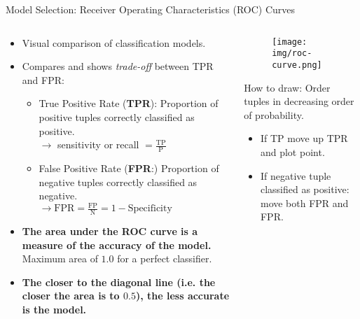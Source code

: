 \begin{frame}{Model Selection: Receiver Operating Characteristics (ROC) Curves}
	\vspace*{-1.5em}
	\begin{columns}
		\begin{column}{0.6\textwidth}
			\begin{itemize}
				\item Visual comparison of classification models.
				\item Compares and shows \textit{trade-off} between TPR and FPR:
				      \begin{itemize}
					      \item True Positive Rate (\textbf{TPR}): Proportion of positive tuples correctly classified as positive.\\
					            $\rightarrow$ sensitivity or recall $= \frac{\text{TP}}{\text{P}}$
					      \item False Positive Rate (\textbf{FPR}:) Proportion of negative tuples correctly classified as negative.\\
					            $\rightarrow \text{FPR} = \frac{\text{FP}}{\text{N}} = 1 - \text{Specificity}$
				      \end{itemize}

				\item \textbf{The area under the ROC curve is a
						      {\color{airforceblue}measure of the accuracy} of the model.}
				      Maximum area of $1.0$ for a perfect classifier.
				\item \textbf{The closer to the diagonal line (i.e. the closer the
					      area is to $0.5$), the less accurate is the model.}

			\end{itemize}
		\end{column}
		\begin{column}{0.4\textwidth}
			\vspace*{-1.5em}
			\begin{figure}
				\centering
				\texttt{[image: img/roc-curve.png]}
			\end{figure}
			\vspace*{-0.5em}
			\scriptsize
			How to draw: Order tuples in decreasing order of probability.
			\begin{itemize}
				\item If TP move up TPR and plot point.
				\item If negative tuple classified as positive: move both FPR and FPR.
			\end{itemize}
		\end{column}
	\end{columns}
\end{frame}

